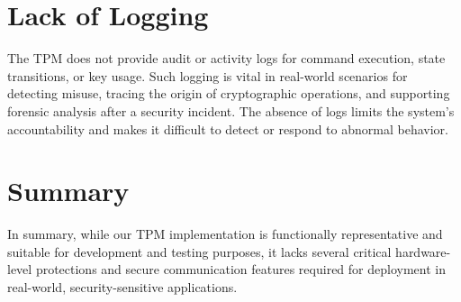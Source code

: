 \section{Lack of Logging}
The TPM does not provide audit or activity logs for command execution, state transitions, or key usage. 
Such logging is vital in real-world scenarios for detecting misuse, tracing the origin of cryptographic operations, and supporting 
forensic analysis after a security incident. 
The absence of logs limits the system's accountability and makes it difficult to detect or respond to abnormal behavior.

\section{Summary}
In summary, while our TPM implementation is functionally representative and suitable for development and testing purposes, 
it lacks several critical hardware-level protections and secure communication features required for deployment in real-world, security-sensitive applications.
